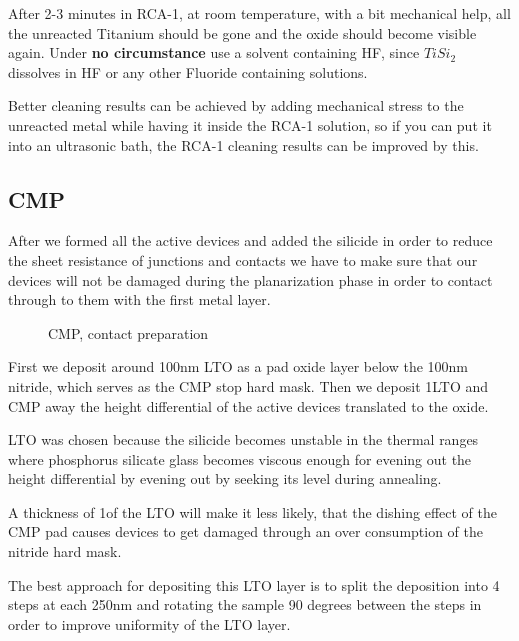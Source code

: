 After 2-3 minutes in RCA-1, at room temperature, with a bit mechanical help, all the unreacted Titanium should be gone and the oxide should become visible again.
Under \textbf{no circumstance} use a solvent containing HF, since $Ti Si_2$ dissolves in HF or any other Fluoride containing solutions.

Better cleaning results can be achieved by adding mechanical stress to the unreacted metal while having it inside the RCA-1 solution,
so if you can put it into an ultrasonic bath, the RCA-1 cleaning results can be improved by this.

\newpage

\subsection{CMP}\label{chapter_silicide_and_cmp}

After we formed all the active devices and added the silicide in order to reduce the sheet resistance of junctions and contacts we have to make sure that
our devices will not be damaged during the planarization phase in order to contact through to them with the first metal layer.

\begin{figure}[H]
	\centering
	\begin{tikzpicture}[node distance = 3cm, auto, thick,scale=\CrossSectionOnly, every node/.style={transform shape}]
		
	\end{tikzpicture}
	\begin{tikzpicture}[node distance = 3cm, auto, thick,scale=\CrossSectionOnly, every node/.style={transform shape}]
		
	\end{tikzpicture}
	\caption{CMP, contact preparation}
\end{figure}

First we deposit around 100nm LTO as a pad oxide layer below the 100nm nitride, which serves as the CMP stop hard mask.
Then we deposit 1\um LTO and CMP away the height differential of the active devices translated to the oxide.

LTO was chosen because the silicide becomes unstable in the thermal ranges where phosphorus silicate glass becomes viscous enough
for evening out the height differential by evening out by seeking its level during annealing.

A thickness of 1\um of the LTO will make it less likely, that the dishing effect of the CMP pad causes devices to get damaged
through an over consumption of the nitride hard mask.

The best approach for depositing this LTO layer is to split the deposition into 4 steps at each 250nm and rotating the sample
90 degrees between the steps in order to improve uniformity of the LTO layer.
